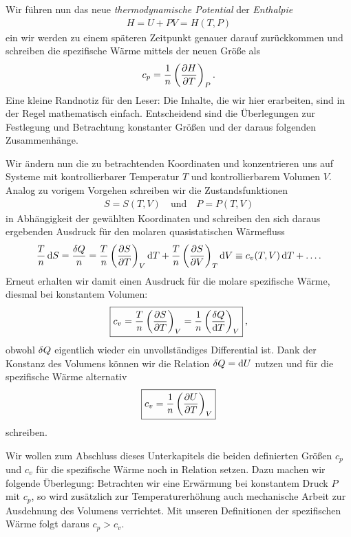 Wir führen nun das neue \emph{thermodynamische Potential} der \emph{Enthalpie}
\begin{align*}
    \boxed{H=U+PV=H(T,P)}
\end{align*}
ein \textendash{} wir werden zu einem späteren Zeitpunkt genauer darauf zurückkommen \textendash{} und schreiben die spezifische Wärme mittels der neuen Größe als
\begin{align*}
    c_p=\frac{1}{n}\left( \frac{\partial H}{\partial T}\right)_P.
\end{align*}
Eine kleine Randnotiz für den Leser: Die Inhalte, die wir hier erarbeiten, sind in der Regel mathematisch einfach. Entscheidend sind die Überlegungen zur Festlegung und Betrachtung konstanter Größen und der daraus folgenden Zusammenhänge.


Wir ändern nun die zu betrachtenden Koordinaten und konzentrieren uns auf Systeme mit kontrollierbarer Temperatur $T$ und kontrollierbarem Volumen $V$.
Analog zu vorigem Vorgehen schreiben wir die Zustandsfunktionen
\begin{align*}
    S=S(T,V)\quad\mathrm{und}\quad P=P(T,V)
\end{align*}
in Abhängigkeit der gewählten Koordinaten und schreiben den sich daraus ergebenden Ausdruck für den molaren quasistatischen Wärmefluss
\begin{align*}
    \frac{T}{n}\mathop{}\!\mathrm{d} S= \frac{\mathop{}\!\delta Q}{n}=\frac{T}{n}\left(\frac{\partial S}{\partial T}\right)_V \mathop{}\!\mathrm{d} T +\frac{T}{n}\left(\frac{\partial S}{\partial V}\right)_T \mathop{}\!\mathrm{d} V\equiv c_v(T,V)\mathop{}\!\mathrm{d} T+\ldots.
\end{align*}
Erneut erhalten wir damit einen Ausdruck für die molare spezifische Wärme, diesmal bei konstantem Volumen:
\begin{align*}
    \boxed{c_v=\frac{T}{n}\left(\frac{\partial S}{\partial T}\right)_V=\frac{1}{n}\left(\frac{\mathop{}\!\delta Q}{\mathop{}\!\mathrm{d} T}\right)_V}\:,
\end{align*}
obwohl $\mathop{}\!\delta Q$ eigentlich wieder ein unvollständiges Differential ist. 
Dank der Konstanz des Volumens können wir die Relation $\mathop{}\!\delta Q=\mathop{}\!\mathrm{d} U$ nutzen und für die spezifische Wärme alternativ
\begin{align*}
    \boxed{c_v=\frac{1}{n}\left(\frac{\partial U}{\partial T}\right)_V}
\end{align*}
schreiben.

Wir wollen zum Abschluss dieses Unterkapitels die beiden definierten Größen $c_p$ und $c_v$ für die spezifische Wärme noch in Relation setzen. Dazu machen wir folgende Überlegung: Betrachten wir eine Erwärmung bei konstantem Druck $P$ mit $c_p$,
so wird zusätzlich zur Temperaturerhöhung auch mechanische Arbeit zur Ausdehnung des Volumens verrichtet. Mit unseren Definitionen der spezifischen Wärme folgt daraus \textbf{$c_p >c_v$}.


